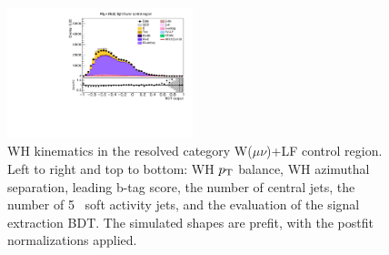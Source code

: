 \begin{figure}[tbp]
\begin{center}
    \includegraphics[width=0.48\textwidth]{figures/wlnhbb2016/resolved/WmnWHLightFlavorCR_bdtValue.pdf}
    \caption{WH kinematics in the resolved category W($\mu\nu$)+LF control region.
    Left to right and top to bottom: WH $p_{\mathrm{T}}$ balance, WH azimuthal separation, leading b-tag score, the number of central jets,
    the number of 5 \GeV\ soft activity jets, and the evaluation of the signal extraction BDT.
    The simulated shapes are prefit, with the postfit normalizations applied.}
    \label{fig:res_WmnLF_WH}
  \end{center}
\end{figure}
\clearpage


